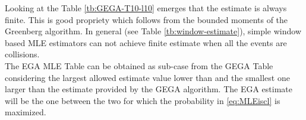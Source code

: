 \documentclass[11pt,a4paper,twoside,openright]{book}
\begin{document}
\begin{table}[htbp]
\centering
{}
\caption{\emph{GEGA}: Possible estimates when $T=10$ and $l=10$}
\label{tb:GEGA-T10-l10}
\end{table}

Looking at the Table \ref{tb:GEGA-T10-l10} emerges that the estimate is always finite. This is good propriety which follows from the bounded moments of the Greenberg algorithm. In general (see Table \ref{tb:window-estimate}), simple window based MLE estimators can not achieve finite estimate when all the events are collisions.\\

The EGA MLE Table can be obtained as sub-case from the GEGA Table considering the largest allowed estimate value lower than and the smallest one larger than the estimate provided by the GEGA algorithm. The EGA estimate will be the one between the two for which the probability in \eqref{eq:MLEiscl} is maximized.
\end{document}

